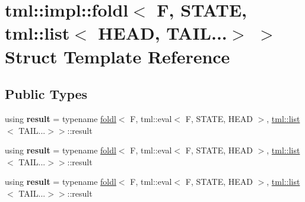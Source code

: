 \hypertarget{structtml_1_1impl_1_1foldl_3_01F_00_01STATE_00_01tml_1_1list_3_01HEAD_00_01TAIL_8_8_8_4_01_4}{\section{tml\+:\+:impl\+:\+:foldl$<$ F, S\+T\+A\+T\+E, tml\+:\+:list$<$ H\+E\+A\+D, T\+A\+I\+L...$>$ $>$ Struct Template Reference}
\label{structtml_1_1impl_1_1foldl_3_01F_00_01STATE_00_01tml_1_1list_3_01HEAD_00_01TAIL_8_8_8_4_01_4}
}
\subsection*{Public Types}
\begin{DoxyCompactItemize}
\item 
\hypertarget{structtml_1_1impl_1_1foldl_3_01F_00_01STATE_00_01tml_1_1list_3_01HEAD_00_01TAIL_8_8_8_4_01_4_a4fb36ab3885d85ea1f325f9456797378}{using {\bfseries result} = typename \hyperlink{structtml_1_1impl_1_1foldl}{foldl}$<$ F, tml\+::eval$<$ F, S\+T\+A\+T\+E, H\+E\+A\+D $>$, \hyperlink{structtml_1_1list}{tml\+::list}$<$ T\+A\+I\+L...$>$$>$\+::result}\label{structtml_1_1impl_1_1foldl_3_01F_00_01STATE_00_01tml_1_1list_3_01HEAD_00_01TAIL_8_8_8_4_01_4_a4fb36ab3885d85ea1f325f9456797378}

\item 
\hypertarget{structtml_1_1impl_1_1foldl_3_01F_00_01STATE_00_01tml_1_1list_3_01HEAD_00_01TAIL_8_8_8_4_01_4_a4fb36ab3885d85ea1f325f9456797378}{using {\bfseries result} = typename \hyperlink{structtml_1_1impl_1_1foldl}{foldl}$<$ F, tml\+::eval$<$ F, S\+T\+A\+T\+E, H\+E\+A\+D $>$, \hyperlink{structtml_1_1list}{tml\+::list}$<$ T\+A\+I\+L...$>$$>$\+::result}\label{structtml_1_1impl_1_1foldl_3_01F_00_01STATE_00_01tml_1_1list_3_01HEAD_00_01TAIL_8_8_8_4_01_4_a4fb36ab3885d85ea1f325f9456797378}

\item 
\hypertarget{structtml_1_1impl_1_1foldl_3_01F_00_01STATE_00_01tml_1_1list_3_01HEAD_00_01TAIL_8_8_8_4_01_4_a4fb36ab3885d85ea1f325f9456797378}{using {\bfseries result} = typename \hyperlink{structtml_1_1impl_1_1foldl}{foldl}$<$ F, tml\+::eval$<$ F, S\+T\+A\+T\+E, H\+E\+A\+D $>$, \hyperlink{structtml_1_1list}{tml\+::list}$<$ T\+A\+I\+L...$>$$>$\+::result}\label{structtml_1_1impl_1_1foldl_3_01F_00_01STATE_00_01tml_1_1list_3_01HEAD_00_01TAIL_8_8_8_4_01_4_a4fb36ab3885d85ea1f325f9456797378}

\end{DoxyCompactItemize}
